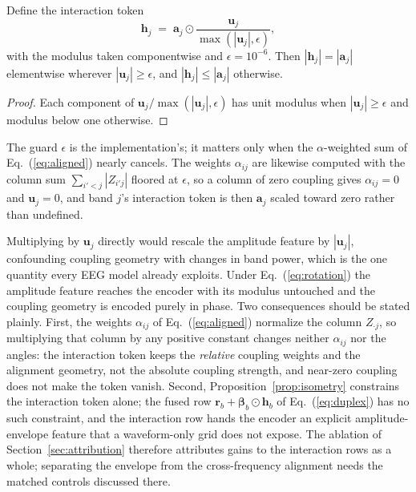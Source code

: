 \begin{proposition}
\label{prop:isometry}
Define the interaction token
\begin{equation}
\mathbf{h}_j \;=\; \mathbf{a}_j \odot
\frac{\mathbf{u}_j}{\max(|\mathbf{u}_j|, \epsilon)} ,
\label{eq:rotation}
\end{equation}
with the modulus taken componentwise and $\epsilon = 10^{-6}$. Then
$|\mathbf{h}_j| = |\mathbf{a}_j|$ elementwise wherever $|\mathbf{u}_j| \ge
\epsilon$, and $|\mathbf{h}_j| \le |\mathbf{a}_j|$ otherwise.
\end{proposition}
\begin{proof}
Each component of $\mathbf{u}_j/\max(|\mathbf{u}_j|,\epsilon)$ has unit
modulus when $|\mathbf{u}_j| \ge \epsilon$ and modulus below one otherwise.
\end{proof}

The guard $\epsilon$ is the implementation's; it matters only when the
$\alpha$-weighted sum of Eq.~(\ref{eq:aligned}) nearly cancels. The
weights $\alpha_{ij}$ are likewise computed with the column sum
$\sum_{i'<j}|Z_{i'j}|$ floored at $\epsilon$, so a column of zero coupling
gives $\alpha_{ij} = 0$ and $\mathbf{u}_j = 0$, and band $j$'s interaction
token is then $\mathbf{a}_j$ scaled toward zero rather than undefined.

Multiplying by $\mathbf{u}_j$ directly would rescale the amplitude feature
by $|\mathbf{u}_j|$, confounding coupling geometry with changes in band
power, which is the one quantity every EEG model already exploits. Under
Eq.~(\ref{eq:rotation}) the amplitude feature reaches the encoder with
its modulus untouched and the coupling geometry is encoded purely in
phase. Two consequences should be stated plainly. First, the weights
$\alpha_{ij}$ of Eq.~(\ref{eq:aligned}) normalize the column
$Z_{\cdot j}$, so multiplying that column by any positive constant changes
neither $\alpha_{ij}$ nor the angles: the interaction token keeps the
\emph{relative} coupling weights and the alignment geometry, not the
absolute coupling strength, and near-zero coupling does not make the
token vanish. Second, Proposition~\ref{prop:isometry} constrains the
interaction token alone; the fused row $\mathbf{r}_b + \boldsymbol{\beta}_b
\odot \mathbf{h}_b$ of Eq.~(\ref{eq:duplex}) has no such constraint, and
the interaction row hands the encoder an explicit amplitude-envelope
feature that a waveform-only grid does not expose. The ablation of
Section~\ref{sec:attribution} therefore attributes gains to the
interaction rows as a whole; separating the envelope from the
cross-frequency alignment needs the matched controls discussed there.

